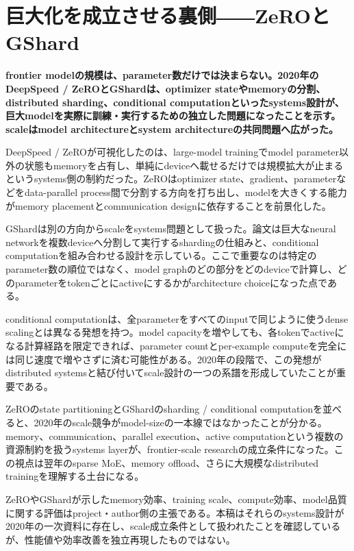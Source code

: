 \section{巨大化を成立させる裏側――ZeROとGShard}
\noindent\textbf{frontier modelの規模は、parameter数だけでは決まらない。2020年のDeepSpeed / ZeROとGShardは、optimizer stateやmemoryの分割、distributed sharding、conditional computationといったsystems設計が、巨大modelを実際に訓練・実行するための独立した問題になったことを示す。scaleはmodel architectureとsystem architectureの共同問題へ広がった。}\autocite{src-56ccf2fa5ce7,src-f1047e7f654c}

DeepSpeed / ZeROが可視化したのは、large-model trainingでmodel parameter以外の状態もmemoryを占有し、単純にdeviceへ載せるだけでは規模拡大が止まるというsystems側の制約だった。ZeROはoptimizer state、gradient、parameterなどをdata-parallel process間で分割する方向を打ち出し、modelを大きくする能力がmemory placementとcommunication designに依存することを前景化した。\autocite{src-f1047e7f654c}


GShardは別の方向からscaleをsystems問題として扱った。論文は巨大なneural networkを複数deviceへ分割して実行するshardingの仕組みと、conditional computationを組み合わせる設計を示している。ここで重要なのは特定のparameter数の順位ではなく、model graphのどの部分をどのdeviceで計算し、どのparameterをtokenごとにactiveにするかがarchitecture choiceになった点である。\autocite{src-56ccf2fa5ce7}


conditional computationは、全parameterをすべてのinputで同じように使うdense scalingとは異なる発想を持つ。model capacityを増やしても、各tokenでactiveになる計算経路を限定できれば、parameter countとper-example computeを完全には同じ速度で増やさずに済む可能性がある。2020年の段階で、この発想がdistributed systemsと結び付いてscale設計の一つの系譜を形成していたことが重要である。\autocite{src-56ccf2fa5ce7}


ZeROのstate partitioningとGShardのsharding / conditional computationを並べると、2020年のscale競争がmodel-sizeの一本線ではなかったことが分かる。memory、communication、parallel execution、active computationという複数の資源制約を扱うsystems layerが、frontier-scale researchの成立条件になった。この視点は翌年のsparse MoE、memory offload、さらに大規模なdistributed trainingを理解する土台になる。\autocite{src-56ccf2fa5ce7,src-f1047e7f654c}


\begin{claimboundary}
ZeROやGShardが示したmemory効率、training scale、compute効率、model品質に関する評価はproject・author側の主張である。本稿はそれらのsystems設計が2020年の一次資料に存在し、scale成立条件として扱われたことを確認しているが、性能値や効率改善を独立再現したものではない。\autocite{src-56ccf2fa5ce7,src-f1047e7f654c}
\end{claimboundary}
